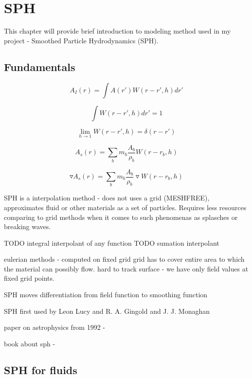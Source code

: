 

\chapter{SPH}


\graphicspath{{sph/figures/}}

This chapter will provide brief introduction to modeling method used in my project - Smoothed Particle Hydrodynamics (SPH).

\section{Fundamentals}



\begin{equation}
\label{eq:sph_interpolant}
A_I(r) = \int A(r')W(r - r', h)dr'
\end{equation}

\begin{equation}
\label{eq:sph_kernel_property_1}
\int W(r - r', h)dr' = 1
\end{equation}

\begin{equation}
\label{eq:sph_kernel_property_2}
\lim_{h \to 1}W(r - r', h) = \delta(r-r')
\end{equation}

\begin{equation}
\label{eq:sumation_interpolant}
A_s(r) = \sum_{b}m_b\frac{A_b}{\rho_b}W(r-r_b,h)
\end{equation}

\begin{equation}
\label{eq:sumation_interpolant_gradient}
\triangledown A_s(r) = \sum_{b}m_b\frac{A_b}{\rho_b}\triangledown W(r-r_b,h) 
\end{equation}

SPH is a interpolation method - does not uses a grid (MESHFREE), approximates fluid or other materials as a set of particles. Requires less resources comparing to grid methods when it comes to such phenomenas as splasches or breaking waves. 

TODO integral interpolant of any function
TODO sumation interpolant

eulerian methods - computed on fixed grid
	grid has to cover entire area to which the material can possibly flow. 
	hard to track surface - we have only field values at fixed grid points. 

SPH moves differentiation from field function to smoothing function

SPH first used by Leon Lucy and R. A. Gingold and J. J. Monaghan


paper on astrophysics from 1992 - \cite{Monaghan1992}

book about sph - \cite{Liu}

\section{SPH for fluids}